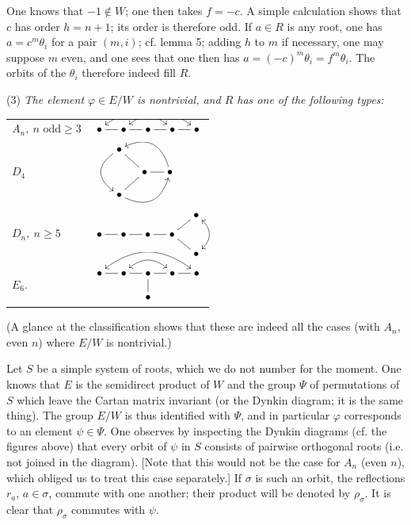 One knows that $-1\notin W$;
one then takes $f=-c$. A simple
calculation shows that $c$ has
order $h=n+1$; its order is
therefore odd. If $a\in R$
is any root, one has
$a=c^m\theta_i$ for a pair
$(m,i)$; cf. lemma 5; adding
$h$ to $m$ if necessary,
one may suppose $m$ even,
and one sees that one then
has $a=(-c)^m\theta_i=f^m\theta_i$.
The orbits of the $\theta_i$
therefore indeed fill $R$.

\noindent (3) \emph{The element
$\varphi\in E/W$ is nontrivial,
and $R$ has one of the
following types:}
\begin{center}
\begin{tabular}{@{}ll@{}}
\rule{0pt}{3em}$A_n,\ n\text{ odd}\geq3$ &
$\xymatrix@C=1.1em{\bullet\ar@{-}[r]\ar@{<->}@/^1.6pc/[rrrr]&
\bullet\ar@{-}[r]\ar@{<->}@/^1pc/[rr]&\bullet\ar@{-}[r]&\bullet\ar@{-}[r]&\bullet}$\\[3em]
\rule{0pt}{3em}$D_4$ &
$\xymatrix@C=1.2em@R=1em{
 &\bullet\ar@{->}@/_1.4pc/[dd]&&\\
 &&\bullet\ar@{-}[ul]\ar@{-}[dl]\ar@{-}[r]&\bullet\ar@{->}@/_1.4pc/[ull]\\
 &\bullet\ar@{->}@/_1.4pc/[urr]&&}$\\[3em]
\rule{0pt}{3em}$D_n,\ n\geq5$ &
$\xymatrix@C=1.1em@R=.7em{
 &&&&\bullet\ar@{<->}@/^1pc/[dd]\\
 \bullet\ar@{-}[r]&\bullet\ar@{-}[r]&\bullet\ar@{-}[r]&\bullet\ar@{-}[ur]\ar@{-}[dr]&\\
 &&&&\bullet}$\\[3em]
\rule{0pt}{3em}$E_6.$ &
$\xymatrix@C=1.1em@R=1.1em{
 \bullet\ar@{-}[r]\ar@{<->}@/^1.6pc/[rrrr]&
 \bullet\ar@{-}[r]\ar@{<->}@/^1pc/[rr]&
 \bullet\ar@{-}[r]\ar@{-}[d]&\bullet\ar@{-}[r]&\bullet\\
 &&\bullet&&}$
\end{tabular}
\end{center}
(A glance at the classification
shows that these are indeed
all the cases (with $A_n$,
even $n$) where $E/W$ is
nontrivial.)

Let $S$ be a simple system
of roots, which we do not
number for the moment.
One knows that $E$ is the
semidirect product of $W$
and the group $\Psi$ of
permutations of $S$ which
leave the Cartan matrix
invariant (or the Dynkin
diagram; it is the same
thing). The group $E/W$
is thus identified with
$\Psi$, and in particular
$\varphi$ corresponds to
an element $\psi\in\Psi$.
One observes by inspecting
the Dynkin diagrams (cf.
the figures above) that
every orbit of $\psi$ in
$S$ consists of pairwise
orthogonal roots (i.e.
not joined in the diagram).
[Note that this would
not be the case for
$A_n$ (even $n$), which
obliged us to treat this
case separately.] If
$\sigma$ is such an
orbit, the reflections
$r_a$, $a\in\sigma$,
commute with one another;
their product will be
denoted by $\rho_\sigma$.
It is clear that
$\rho_\sigma$ commutes
with $\psi$.

